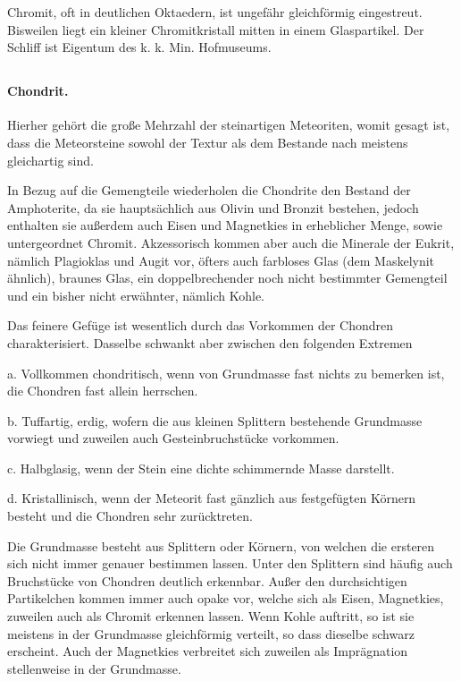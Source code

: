 \documentclass[a4paper, 12pt, oneside]{article}
\begin{document}
Chromit, oft in deutlichen Oktaedern, ist ungefähr gleichförmig eingestreut. Bisweilen liegt ein kleiner Chromitkristall mitten in einem Glaspartikel. Der Schliff ist Eigentum des k. k. Min. Hofmuseums.
\clearpage
\subsection{}
\paragraph{Chondrit.} Hierher gehört die große Mehrzahl der steinartigen Meteoriten, womit gesagt ist, dass die Meteorsteine sowohl der Textur als dem Bestande nach meistens gleichartig sind.

In Bezug auf die Gemengteile wiederholen die Chondrite den Bestand der Amphoterite, da sie hauptsächlich aus Olivin und Bronzit bestehen, jedoch enthalten sie außerdem auch Eisen und Magnetkies in erheblicher Menge, sowie untergeordnet Chromit. Akzessorisch kommen aber auch die Minerale der Eukrit, nämlich Plagioklas und Augit vor, öfters auch farbloses Glas (dem Maskelynit ähnlich), braunes Glas, ein doppelbrechender noch nicht bestimmter Gemengteil und ein bisher nicht erwähnter, nämlich Kohle.

Das feinere Gefüge ist wesentlich durch das Vorkommen der Chondren charakterisiert. Dasselbe schwankt aber zwischen den folgenden Extremen

a. Vollkommen chondritisch, wenn von Grundmasse fast nichts zu bemerken ist, die Chondren fast allein herrschen.

b. Tuffartig, erdig, wofern die aus kleinen Splittern bestehende Grundmasse vorwiegt und zuweilen auch Gesteinbruchstücke vorkommen.

c. Halbglasig, wenn der Stein eine dichte schimmernde Masse darstellt.

d. Kristallinisch, wenn der Meteorit fast gänzlich aus festgefügten Körnern besteht und die Chondren sehr zurücktreten.

Die Grundmasse besteht aus Splittern oder Körnern, von welchen die ersteren sich nicht immer genauer bestimmen lassen. Unter den Splittern sind häufig auch Bruchstücke von Chondren deutlich erkennbar. Außer den durchsichtigen Partikelchen kommen immer auch opake vor, welche sich als Eisen, Magnetkies, zuweilen auch als Chromit erkennen lassen. Wenn Kohle auftritt, so ist sie meistens in der Grundmasse gleichförmig verteilt, so dass dieselbe schwarz erscheint. Auch der Magnetkies verbreitet sich zuweilen als Imprägnation stellenweise in der Grundmasse.
\end{document}
